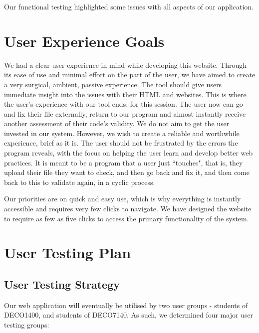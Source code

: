 \documentclass[10pt]{article}
\begin{document}
Our functional testing highlighted some issues with all aspects of our application.


\newpage

\section*{User Experience Goals}

We had a clear user experience in mind while developing this website. Through its ease of use and minimal effort on the part of the user, we have aimed to create a very surgical, ambient, passive experience. The tool should give users immediate insight into the issues with their HTML and websites. This is where the user's experience with our tool ends, for this session. The user now can go and fix their file externally, return to our program and almost instantly receive another assessment of their code's validity. We do not aim to get the user invested in our system. However, we wish to create a reliable and worthwhile experience, brief as it is. The user should not be frustrated by the errors the program reveals, with the focus on helping the user learn and develop better web practices. It is meant to be a program that a user just ``touches", that is, they upload their file they want to check, and then go back and fix it, and then come back to this to validate again, in a cyclic process.

Our priorities are on quick and easy use, which is why everything is instantly accessible and requires very few clicks to navigate. We have designed the website to require as few as five clicks to access the primary functionality of the system. %

\newpage

\section*{User Testing Plan}

\subsection*{User Testing Strategy}

Our web application will eventually be utilised by two user groups - students of DECO1400, and students of DECO7140. As such, we determined four major user testing groups:
\end{document}
